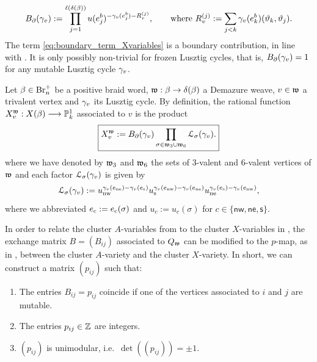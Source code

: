 \begin{equation}\label{eq:boundary_term_Xvariables}
B_\partial(\gamma_v):=
\displaystyle
\prod_{j=1}^{\ell(\delta(\beta))}u(e_j^{b})^{-\gamma_v(e_j^{b})-R_v^{(j)}},\qquad\mbox{where }R_v^{(j)}:=\displaystyle\sum_{j<k}\gamma_v(e_k^{b})(\vartheta_k,\vartheta_j).
\end{equation}
\noindent The term \eqref{eq:boundary_term_Xvariables} is a boundary contribution, in line with . It is only possibly non-trivial for frozen Lusztig cycles, that is, $B_\partial(\gamma_v)=1$ for any mutable Lusztig cycle $\gamma_v$.\\

\begin{fdef}\label{def:cluster_Xvariables_weave}
Let $\beta\in\mbox{Br}_n^+$ be a positive braid word, $\mathfrak{w}:\beta\to\delta(\beta)$ a Demazure weave, $v\in\mathfrak{w}$ a trivalent vertex and $\gamma_v$ its Lusztig cycle. By definition, the rational function $X^{\mathfrak{w}}_v:X(\beta)\longrightarrow\mathbb{P}_k^1$ associated to $v$ is the product
\begin{equation}\label{eq:cluster_X_variables}
\boxed{
X^{\mathfrak{w}}_v:=B_\partial(\gamma_v)\prod_{\sigma\in \mathfrak{w}_3\cup \mathfrak{w}_6}\mathcal{L}_\sigma(\gamma_v).
}
\end{equation}
where we have denoted by $\mathfrak{w}_3$ and $\mathfrak{w}_6$ the sets of 3-valent and 6-valent vertices of $\mathfrak{w}$ and each factor $\mathcal{L}_\sigma(\gamma_v)$ is given by
$$\mathcal{L}_\sigma(\gamma_v):=
\displaystyle
u_{\rm nw}^{\gamma_v(e_{\rm ne})-\gamma_v(e_{\rm s})}u_{\rm s}^{\gamma_v(e_{\rm nw})-\gamma_v(e_{\rm ne})}u_{\rm ne}^{\gamma_v(e_{\rm s})-\gamma_v(e_{\rm nw})},$$
where we abbreviated $e_{\rm c}:=e_{\rm c}(\sigma)$ and $u_{c}:=u_c(\sigma)$ for $c\in\{\mathsf{nw},\mathsf{ne},\mathsf{s}\}$.\sbs
\end{fdef}
\vspace{0.2cm}

In order to relate the cluster $A$-variables from  to the cluster $X$-variables in , the exchange matrix $B=(B_{ij})$ associated to $Q_{\mathfrak{w}}$ can be modified to the $p$-map, as in \cite[Section 8.2]{CGGLSS25}, between the cluster $A$-variety and the cluster $X$-variety. In short, we can construct a matrix $(p_{ij})$ such that:

\begin{enumerate}
\item The entries $B_{ij}=p_{ij}$ coincide if one of the vertices associated to $i$ and $j$ are mutable.
    \item The entries $p_{ij}\in\mathbb{Z}$ are integers.
    \item $(p_{ij})$ is unimodular, i.e.~$\det((p_{ij}))=\pm1$.
\end{enumerate}

